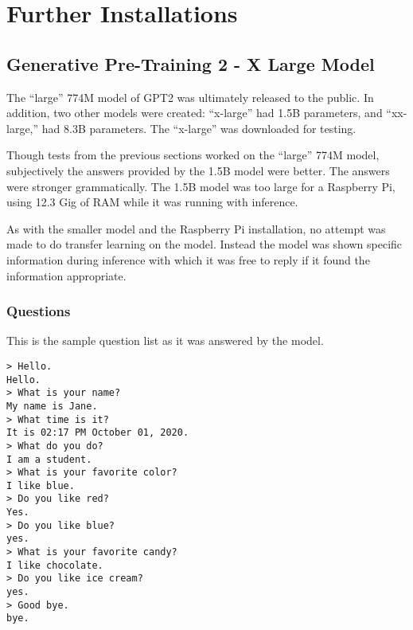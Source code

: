 \chapter{Further Installations}

\section{Generative Pre-Training 2 - X Large Model}

The ``large'' 774M model of GPT2 was ultimately released to the public. In addition, two other models were created: ``x-large'' had 1.5B parameters, and ``xx-large,'' had 8.3B parameters. The ``x-large'' was downloaded for testing.

Though tests from the previous sections worked on the ``large'' 774M model, subjectively the answers provided by the 1.5B model were better. The answers were stronger grammatically. The 1.5B model was too large for a Raspberry Pi, using 12.3 Gig of RAM while it was running with inference. %

As with the smaller model and the Raspberry Pi installation, no attempt was made to do transfer learning on the model. Instead the model was shown specific information during inference with which it was free to reply if it found the information appropriate.


\label{chapter-gpt2-xl-intro}

\subsection{Questions}

This is the sample question list as it was answered by the model.

\begin{verbatim}
> Hello.
Hello. 
> What is your name? 
My name is Jane.  
> What time is it?
It is 02:17 PM October 01, 2020. 
> What do you do? 
I am a student. 
> What is your favorite color? 
I like blue. 
> Do you like red?
Yes. 
> Do you like blue? 
yes. 
> What is your favorite candy? 
I like chocolate. 
> Do you like ice cream?
yes. 
> Good bye.
bye. 
\end{verbatim}

